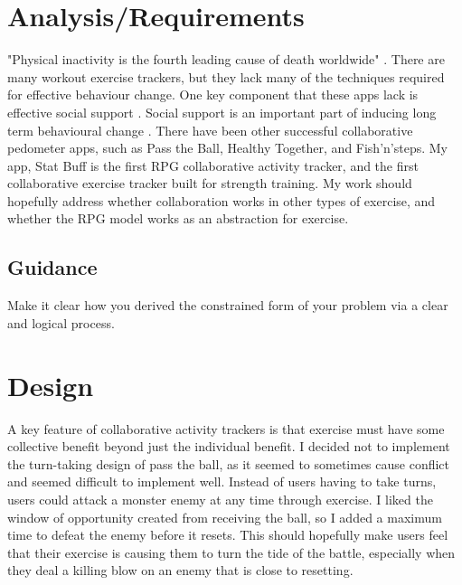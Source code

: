 \documentclass{l4proj}
\begin{document}
\chapter{Analysis/Requirements}
"Physical inactivity is the fourth leading cause of death worldwide" \citep{inactivity}. There are many workout exercise trackers, but they lack many of the techniques required for effective behaviour change. One key component that these apps lack is effective social support \citep{AppsOfSteel}. Social support is an important part of inducing long term behavioural change \citep{Integrated_Theory}. There have been other successful collaborative pedometer apps, such as Pass the Ball, Healthy Together, and Fish'n'steps. My app, Stat Buff is the first RPG collaborative activity tracker, and the first collaborative exercise tracker built for strength training. My work should hopefully address whether collaboration works in other types of exercise, and whether the RPG model works as an abstraction for exercise.

\section{Guidance}
Make it clear how you derived the constrained form of your problem via a clear and logical process. 

\chapter{Design}

A key feature of collaborative activity trackers is that exercise must have some collective benefit beyond just the individual benefit. I decided not to implement the turn-taking design of pass the ball, as it seemed to sometimes cause conflict and seemed difficult to implement well. Instead of users having to take turns, users could attack a monster enemy at any time through exercise. I liked the window of opportunity created from receiving the ball, so I added a maximum time to defeat the enemy before it resets. This should hopefully make users feel that their exercise is causing them to turn the tide of the battle, especially when they deal a killing blow on an enemy that is close to resetting.
\end{document}
